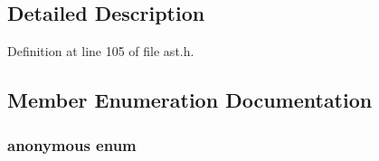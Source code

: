 \subsection{Detailed Description}


Definition at line 105 of file ast.h.



\subsection{Member Enumeration Documentation}
\hypertarget{classmocha_1_1_ast_node_a7e049e71bcf600466f1c977205d8215b}{
\subsubsection[{"@0}]{\setlength{\rightskip}{0pt plus 5cm}anonymous enum}}
\label{classmocha_1_1_ast_node_a7e049e71bcf600466f1c977205d8215b}
